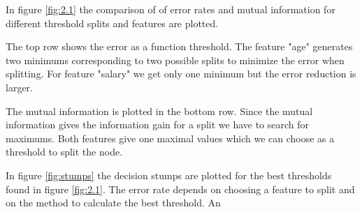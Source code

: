 \documentclass[12pt]{article}
\begin{document}
In figure \ref{fig:2.1} the comparison of of error rates and mutual information for different threshold splits and features are plotted. \par 
The top row shows the error as a function threshold. The feature "age" generates two minimums corresponding to two possible splits to minimize the error when splitting. For feature "salary" we get only one minimum but the error reduction is larger. \par 
The mutual information is plotted in the bottom row. Since the mutual information gives the information gain for a split we have to search for maximums. Both features give one maximal values which we can choose as a threshold to split the node. \par
In figure \ref{fig:stumps} the decision stumps are plotted for the best thresholds found in figure \ref{fig:2.1}. The error rate depends on choosing a feature to split and on the method to calculate the best threshold. An 
\end{document}
